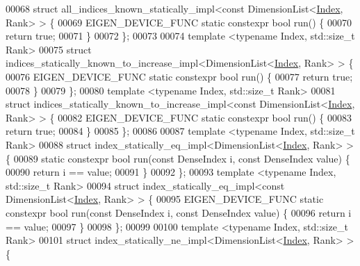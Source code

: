\begin{DoxyCode}
00068 \textcolor{keyword}{struct }all\_indices\_known\_statically\_impl<const DimensionList<\hyperlink{namespace_eigen_a62e77e0933482dafde8fe197d9a2cfde}{Index}, Rank> > \{
00069   EIGEN\_DEVICE\_FUNC \textcolor{keyword}{static} constexpr \textcolor{keywordtype}{bool} run() \{
00070     \textcolor{keywordflow}{return} \textcolor{keyword}{true};
00071   \}
00072 \};
00073 
00074 \textcolor{keyword}{template} <\textcolor{keyword}{typename} Index, std::\textcolor{keywordtype}{size\_t} Rank>
00075 \textcolor{keyword}{struct }indices\_statically\_known\_to\_increase\_impl<DimensionList<\hyperlink{namespace_eigen_a62e77e0933482dafde8fe197d9a2cfde}{Index}, Rank> > \{
00076   EIGEN\_DEVICE\_FUNC \textcolor{keyword}{static} constexpr \textcolor{keywordtype}{bool} run() \{
00077     \textcolor{keywordflow}{return} \textcolor{keyword}{true};
00078   \}
00079 \};
00080 \textcolor{keyword}{template} <\textcolor{keyword}{typename} Index, std::\textcolor{keywordtype}{size\_t} Rank>
00081 \textcolor{keyword}{struct }indices\_statically\_known\_to\_increase\_impl<const DimensionList<\hyperlink{namespace_eigen_a62e77e0933482dafde8fe197d9a2cfde}{Index}, Rank> > \{
00082   EIGEN\_DEVICE\_FUNC \textcolor{keyword}{static} constexpr \textcolor{keywordtype}{bool} run() \{
00083     \textcolor{keywordflow}{return} \textcolor{keyword}{true};
00084   \}
00085 \};
00086 
00087 \textcolor{keyword}{template} <\textcolor{keyword}{typename} Index, std::\textcolor{keywordtype}{size\_t} Rank>
00088 \textcolor{keyword}{struct }index\_statically\_eq\_impl<DimensionList<\hyperlink{namespace_eigen_a62e77e0933482dafde8fe197d9a2cfde}{Index}, Rank> > \{
00089   \textcolor{keyword}{static} constexpr \textcolor{keywordtype}{bool} run(\textcolor{keyword}{const} DenseIndex i, \textcolor{keyword}{const} DenseIndex value) \{
00090     \textcolor{keywordflow}{return} i == value;
00091   \}
00092 \};
00093 \textcolor{keyword}{template} <\textcolor{keyword}{typename} Index, std::\textcolor{keywordtype}{size\_t} Rank>
00094 \textcolor{keyword}{struct }index\_statically\_eq\_impl<const DimensionList<\hyperlink{namespace_eigen_a62e77e0933482dafde8fe197d9a2cfde}{Index}, Rank> > \{
00095   EIGEN\_DEVICE\_FUNC \textcolor{keyword}{static} constexpr \textcolor{keywordtype}{bool} run(\textcolor{keyword}{const} DenseIndex i, \textcolor{keyword}{const} DenseIndex value) \{
00096     \textcolor{keywordflow}{return} i == value;
00097   \}
00098 \};
00099 
00100 \textcolor{keyword}{template} <\textcolor{keyword}{typename} Index, std::\textcolor{keywordtype}{size\_t} Rank>
00101 \textcolor{keyword}{struct }index\_statically\_ne\_impl<DimensionList<\hyperlink{namespace_eigen_a62e77e0933482dafde8fe197d9a2cfde}{Index}, Rank> > \{

\end{DoxyCode}
